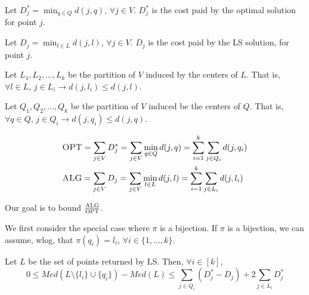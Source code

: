     Let $D_j^* = \min_{q \in Q} d(j,q)$, $\forall j \in V$. $D_j^*$ is the cost paid by the optimal solution for point $j$.

    Let $D_j = \min_{l \in L} d(j,l)$, $\forall j \in V$. $D_j$ is the cost paid by the LS solution, for point $j$.

    Let $L_1, L_2, \dots, L_k$ be the partition of $V$ induced by the centers of $L$.
    That is, $\forall l \in L$, $j \in L_i \rightarrow d(j,l_i) \leq d(j,l)$.

    Let $Q_1, Q_2, \dots, Q_k$ be the partition of $V$ induced be the centers of $Q$.
    That is, $\forall q \in Q$, $j \in Q_i \rightarrow d(j,q_i) \leq d(j,q)$.

    \begin{equation*}
        \begin{split}
            &\textsc{OPT} = \sum_{j \in V} D_j^* = \sum_{j \in V} \min_{q \in Q} d(j,q) = \sum_{i=1}^{k} \sum_{j \in Q_i} d(j,q_i)\\
            &\textsc{ALG} = \sum_{j \in V} D_j = \sum_{j \in V} \min_{l \in L} d(j,l) = \sum_{i=1}^{k} \sum_{j \in L_i} d(j,l_i)
        \end{split}
    \end{equation*}

    Our goal is to bound $\frac{\textsc{ALG}}{\textsc{OPT}}$.

    We first consider the special case where $\pi$ is a bijection.
    If $\pi$ is a bijection, we can assume, wlog, that $\pi(q_i) = l_i$, $\forall i \in \{ 1, \dots, k \}$.

    \begin{lemma}\label{lemma:kmedian}
        Let $L$ be the set of points returned by LS.
        Then, $\forall i \in [k]$,
        \[ 0 \leq Med(L \setminus \{l_i\} \cup \{q_i\}) - Med(L) \leq \sum_{j \in Q_i}(D_j^* - D_j) + 2 \sum_{j \in L_i} D_j^* \]
    \end{lemma}


